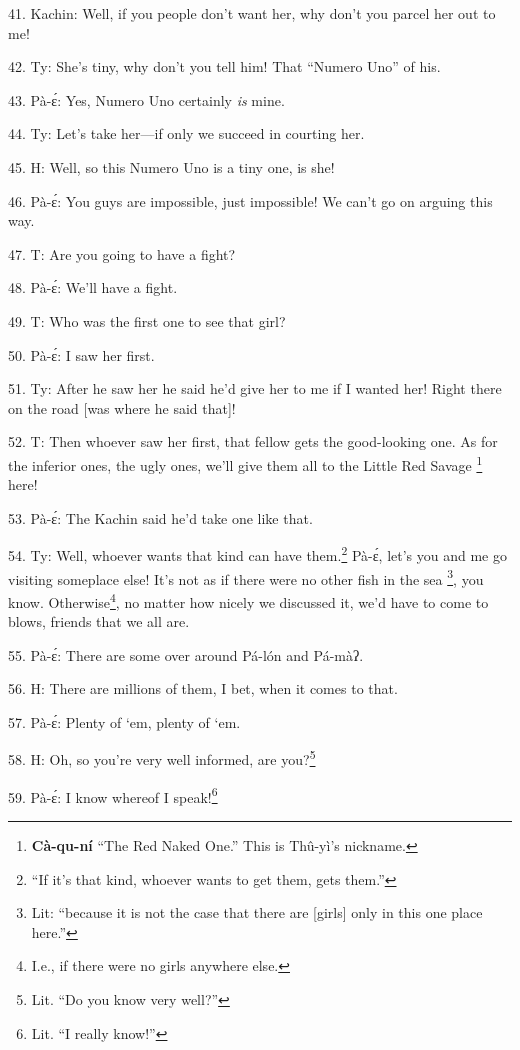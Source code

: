41. Kachin: Well, if you people don't want her, why don't you parcel her out to
me!

42. Ty: She's tiny, why don't you tell him! That ``Numero Uno'' of his.

43. Pà-ɛ́: Yes, Numero Uno certainly\textit{ is} mine.

44. Ty: Let's take her---if only we succeed in courting her.

45. H: Well, so this Numero Uno is a tiny one, is she!

46. Pà-ɛ́: You guys are impossible, just impossible! We can't go on arguing this
way.

47. T: Are you going to have a fight?

48. Pà-ɛ́: We'll have a fight.

49. T: Who was the first one to see that girl?

50. Pà-ɛ́: I saw her first.

51. Ty: After he saw her he said he'd give her to me if I wanted her! Right there
on the road [was where he said that]!

52. T: Then whoever saw her first, that fellow gets the good-looking one. As
for the inferior ones, the ugly ones, we'll give them all to the Little Red Savage
\footnote{\textbf{Cà-qu-ní} ``The Red Naked One.'' This is Thû-yì's nickname.} here!


53. Pà-ɛ́: The Kachin said he'd take one like that.

54. Ty: Well, whoever wants that kind can have them.\footnote{``If it's that kind, whoever wants to get them, gets them.''} Pà-ɛ́, let's you and
me go visiting someplace else! It's not as if there were no other fish in the sea
\footnote{Lit: ``because it is not the case that there are [girls] only in this one place here.''}, you know. Otherwise\footnote{I.e., if there were no girls anywhere else.}, no matter how nicely we discussed it, we'd have
to come to blows, friends that we all are.

55. Pà-ɛ́: There are some over around Pá-lón and Pá-màʔ.

56. H: There are millions of them, I bet, when it comes to that.

57. Pà-ɛ́: Plenty of `em, plenty of `em.

58. H: Oh, so you're very well informed, are you?\footnote{Lit. ``Do you know very well?''}

59. Pà-ɛ́: I know whereof I speak!\footnote{Lit. ``I really know!''}

